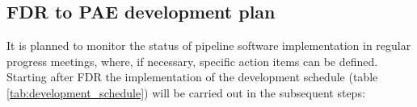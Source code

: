 \begin{table}
\end{table}

\subsection{FDR to PAE development plan}
\label{ssec:fdr2pae}

It is planned to monitor the status of pipeline software implementation in regular progress meetings, where, if necessary, specific action items can be defined. Starting after FDR the implementation of the development schedule (table \ref{tab:development_schedule}) will be carried out in the subsequent steps:

